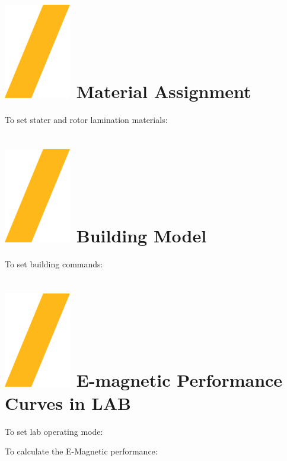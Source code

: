 \documentclass[landscape]{article}
\begin{document}
\begin{multicols}{3}
\section{\includegraphics[height=\fontcharht\font`\S]{slash.png} Material Assignment}
To set stater and rotor lamination materials:

\section{\includegraphics[height=\fontcharht\font`\S]{slash.png} Building Model}
To set building commands:

\section{\includegraphics[height=\fontcharht\font`\S]{slash.png} E-magnetic Performance Curves in LAB}
To set lab operating mode:

To calculate the E-Magnetic performance:


\end{multicols}
\end{document}
